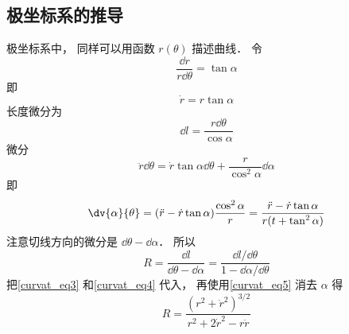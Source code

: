 \subsection{极坐标系的推导}
极坐标系中， 同样可以用函数 $r(\theta)$ 描述曲线．
令
\begin{equation}
\frac{\dd{r}}{r \dd{\theta}} = \tan\alpha
\end{equation}
即
\begin{equation}\label{curvat_eq5}
\dot r = r\tan\alpha
\end{equation}
长度微分为
\begin{equation}
\dd{l} = \frac{r\dd{\theta}}{\cos\alpha}
\end{equation}
微分
\begin{equation}
\ddot r\dd{\theta} = \dot r\tan\alpha\dd{\theta} + \frac{r}{\cos^2\alpha}\dd{\alpha}
\end{equation}
即
\begin{equation}\label{curvat_eq4}
\dv{\alpha}{\theta} = (\ddot r - \dot r \tan\alpha) \frac{\cos^2\alpha}{r} = \frac{\ddot r - \dot r\tan\alpha}{r(t + \tan^2\alpha)}
\end{equation}
注意切线方向的微分是 $\dd{\theta} - \dd{\alpha}$． 所以
\begin{equation}
R = \frac{\dd{l}}{\dd{\theta} - \dd{\alpha}} = \frac{\dd{l}/\dd{\theta}}{1 - \dd{\alpha}/\dd{\theta}}
\end{equation}
把\autoref{curvat_eq3} 和\autoref{curvat_eq4} 代入， 再使用\autoref{curvat_eq5} 消去 $\alpha$ 得
\begin{equation}
R = \frac{(r^2 + \dot r^2)^{3/2}}{r^2 + 2\dot r^2 - r\ddot r}
\end{equation}
